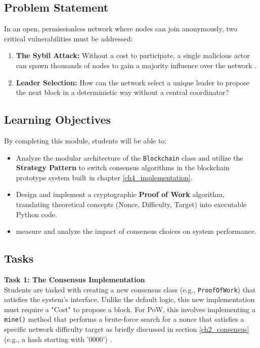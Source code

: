 \subsection{Problem Statement}
In an open, permissionless network where nodes can join anonymously, two critical vulnerabilities must be addressed:
\begin{enumerate}
    \item \textbf{The Sybil Attack:} Without a cost to participate, a single malicious actor can spawn thousands of nodes to gain a majority influence over the network \cite{douceur2002sybil}.
    \item \textbf{Leader Selection:} How can the network select a unique leader to propose the next block in a deterministic way without a central coordinator?
\end{enumerate}

\subsection{Learning Objectives}
By completing this module, students will be able to:
\begin{itemize}
    \item Analyze the modular architecture of the \texttt{Blockchain} class and utilize the \textbf{Strategy Pattern} to switch consensus algorithms in the blockchain prototype system built in chapter \ref{ch4_implementation}.
    \item Design and implement a cryptographic \textbf{Proof of Work} algorithm, translating theoretical concepts (Nonce, Difficulty, Target) into executable Python code.
    \item measure and analyze the impact of consensus choices on system performance.
\end{itemize}

\subsection{Tasks}

\textbf{Task 1: The Consensus Implementation} \\
Students are tasked with creating a new consensus class (e.g., \texttt{ProofOfWork}) that satisfies the system's interface. Unlike the default logic, this new implementation must require a "Cost" to propose a block. For PoW, this involves implementing a \texttt{mine()} method that performs a brute-force search for a nonce that satisfies a specific network difficulty target as briefly discussed in section \ref{ch2_consensus} (e.g., a hash starting with '0000') .
\newline

